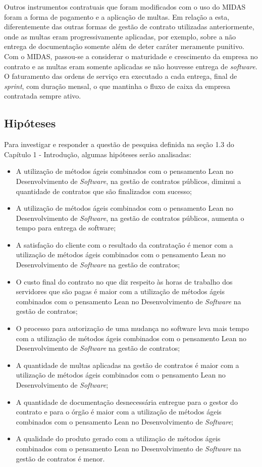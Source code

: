 Outros instrumentos contratuais que foram modificados com o uso do MIDAS foram a forma de pagamento e a aplicação de multas. Em relação a esta, diferentemente das outras formas de gestão de contrato utilizadas anteriormente, onde as multas eram progressivamente aplicadas, por exemplo, sobre a não entrega de documentação somente além de deter caráter meramente punitivo. Com o MIDAS, passou-se a considerar o maturidade e crescimento da empresa no contrato e as multas eram somente aplicadas se não houvesse entrega de \textit{software}. O faturamento das ordens de serviço era executado a cada entrega, final de \textit{sprint}, com duração mensal, o que mantinha o fluxo de caixa da empresa contratada sempre ativo.

\subsection[Hipóteses]{Hipóteses}

Para investigar e responder a questão de pesquisa definida na seção 1.3 do Capítulo 1 - Introdução, algumas hipóteses serão analisadas:
\begin{itemize}
\item  A utilização de métodos ágeis combinados com o pensamento Lean no Desenvolvimento de \textit{Software}, na gestão de contratos públicos, diminui a quantidade de contratos que são finalizados com sucesso;
\item  A utilização de métodos ágeis combinados com o pensamento Lean no Desenvolvimento de \textit{Software}, na gestão de contratos públicos, aumenta o tempo para entrega de software;
\item	A satisfação do cliente com o resultado da contratação é menor com a utilização de métodos ágeis combinados com o pensamento Lean no Desenvolvimento de \textit{Software} na gestão de contratos;
\item  O custo final do contrato no que diz respeito às horas de trabalho dos servidores que são pagas é maior com a utilização de métodos ágeis combinados com o pensamento Lean no Desenvolvimento de \textit{Software} na gestão de contratos;
\item  O processo para autorização de uma mudança no software leva mais tempo com a utilização de métodos ágeis combinados com o pensamento Lean no Desenvolvimento de \textit{Software} na gestão de contratos;
\item	A quantidade de multas aplicadas na gestão de contratos é maior com a utilização de métodos ágeis combinados com o pensamento Lean no Desenvolvimento de \textit{Software};
\item	A quantidade de documentação desnecessária entregue para o gestor do contrato e para o órgão é maior com a utilização de métodos ágeis combinados com o pensamento Lean no Desenvolvimento de \textit{Software};
\item  A qualidade do produto gerado com a utilização de métodos ágeis combinados com o pensamento Lean no Desenvolvimento de \textit{Software} na gestão de contratos é menor.
\end{itemize}

